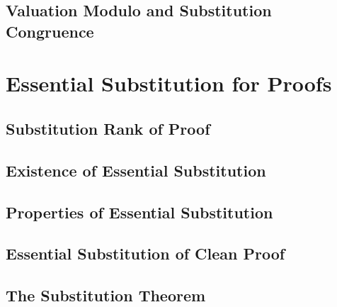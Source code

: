     \subsection{Valuation Modulo and Substitution Congruence}
      
\section{Essential Substitution for Proofs}
    \subsection{Substitution Rank of Proof}
      
    \subsection{Existence of Essential Substitution}
      
    \subsection{Properties of Essential Substitution}
      
    \subsection{Essential Substitution of Clean Proof}
      
    \subsection{The Substitution Theorem}
      


